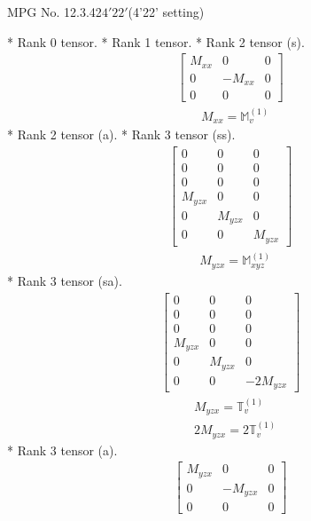 \documentclass[fleqn,8pt,landscape]{jsarticle}
\begin{document}
\setcounter{MaxMatrixCols}{32}

\renewcommand{\tablename}{Table~}
\renewcommand{\figurename}{Figure~}
\begin{center}
\LARGE
MPG No. 12.3.42\quad$4'22'$\quad(4'22' setting)
\end{center}
* Rank 0 tensor.
* Rank 1 tensor.
* Rank 2 tensor (s).
\begin{align*}
\begin{bmatrix} M_{xx} & 0 & 0 \\ 0 & - M_{xx} & 0 \\ 0 & 0 & 0 \end{bmatrix}
\end{align*}
\begin{align*}
& M_{xx} = \mathbb{M}_{v}^{(1)}
\end{align*}
* Rank 2 tensor (a).
* Rank 3 tensor (ss).
\begin{align*}
\begin{bmatrix} 0 & 0 & 0 \\ 0 & 0 & 0 \\ 0 & 0 & 0 \\ M_{yzx} & 0 & 0 \\ 0 & M_{yzx} & 0 \\ 0 & 0 & M_{yzx} \end{bmatrix}
\end{align*}
\begin{align*}
& M_{yzx} = \mathbb{M}_{xyz}^{(1)}
\end{align*}
* Rank 3 tensor (sa).
\begin{align*}
\begin{bmatrix} 0 & 0 & 0 \\ 0 & 0 & 0 \\ 0 & 0 & 0 \\ M_{yzx} & 0 & 0 \\ 0 & M_{yzx} & 0 \\ 0 & 0 & - 2 M_{yzx} \end{bmatrix}
\end{align*}
\begin{align*}
& M_{yzx} = \mathbb{T}_{v}^{(1)} \\
& 2 M_{yzx} = 2 \mathbb{T}_{v}^{(1)}
\end{align*}
* Rank 3 tensor (a).
\begin{align*}
\begin{bmatrix} M_{yzx} & 0 & 0 \\ 0 & - M_{yzx} & 0 \\ 0 & 0 & 0 \end{bmatrix}
\end{align*}
\end{document}
